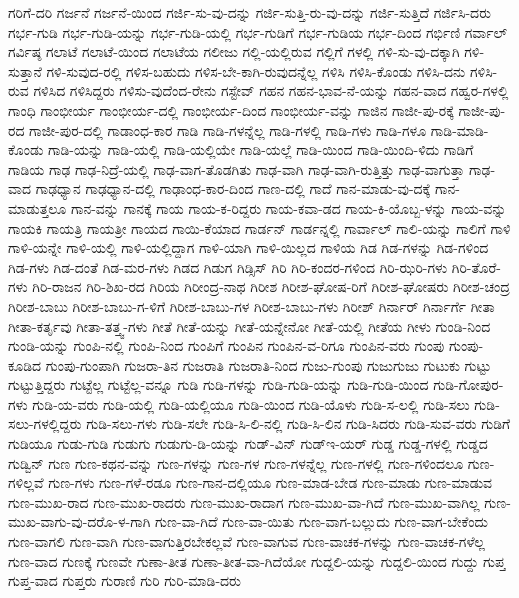 {ಗರಿಗೆ-ದರಿ
ಗರ್ಜನೆ
ಗರ್ಜನೆ-ಯಿಂದ
ಗರ್ಜಿ-ಸು-ವು-ದನ್ನು
ಗರ್ಜಿ-ಸುತ್ತಿ-ರು-ವು-ದನ್ನು
ಗರ್ಜಿ-ಸುತ್ತಿದೆ
ಗರ್ಜಿಸಿ-ದರು
ಗರ್ಭ-ಗುಡಿ
ಗರ್ಭ-ಗುಡಿ-ಯನ್ನು
ಗರ್ಭ-ಗುಡಿ-ಯಲ್ಲಿ
ಗರ್ಭ-ಗುಡಿಗೆ
ಗರ್ಭ-ಗುಡಿಯ
ಗರ್ಭ-ದಿಂದ
ಗರ್ಭಿಣಿ
ಗರ್ವಾಲ್
ಗರ್ವಿಷ್ಠ
ಗಲಾಟೆ
ಗಲಾಟೆ-ಯಿಂದ
ಗಲಾಟೆಯ
ಗಲೀಜು
ಗಲ್ಲಿ-ಯಲ್ಲಿರುವ
ಗಲ್ಲಿಗೆ
ಗಳಲ್ಲಿ
ಗಳಿ-ಸು-ವು-ದಕ್ಕಾಗಿ
ಗಳಿ-ಸುತ್ತಾನೆ
ಗಳಿ-ಸುವುದ-ರಲ್ಲಿ
ಗಳಿಸ-ಬಹುದು
ಗಳಿಸ-ಬೇ-ಕಾಗಿ-ರುವುದನ್ನೆಲ್ಲ
ಗಳಿಸಿ
ಗಳಿಸಿ-ಕೊಂಡು
ಗಳಿಸಿ-ದನು
ಗಳಿಸಿ-ರುವ
ಗಳಿಸಿದ
ಗಳಿಸಿದ್ದರು
ಗಳಿಸು-ವುದೆಂದ-ರೇನು
ಗಸ್ಟೇವ್
ಗಹನ
ಗಹನ-ಭಾವ-ನೆ-ಯನ್ನು
ಗಹನ-ವಾದ
ಗಹ್ವರ-ಗಳಲ್ಲಿ
ಗಾಂಧಿ
ಗಾಂಭೀರ್ಯ
ಗಾಂಭೀರ್ಯ-ದಲ್ಲಿ
ಗಾಂಭೀರ್ಯ-ದಿಂದ
ಗಾಂಭೀರ್ಯ-ವನ್ನು
ಗಾಜಿನ
ಗಾಜೀ-ಪು-ರಕ್ಕೆ
ಗಾಜೀ-ಪು-ರದ
ಗಾಜೀ-ಪುರ-ದಲ್ಲಿ
ಗಾಡಾಂಧ-ಕಾರ
ಗಾಡಿ
ಗಾಡಿ-ಗಳನ್ನೆಲ್ಲ
ಗಾಡಿ-ಗಳಲ್ಲಿ
ಗಾಡಿ-ಗಳು
ಗಾಡಿ-ಗಳೂ
ಗಾಡಿ-ಮಾಡಿ-ಕೊಂಡು
ಗಾಡಿ-ಯನ್ನು
ಗಾಡಿ-ಯಲ್ಲಿ
ಗಾಡಿ-ಯಲ್ಲಿಯೇ
ಗಾಡಿ-ಯಲ್ಲೆ
ಗಾಡಿ-ಯಿಂದ
ಗಾಡಿ-ಯಿಂದಿ-ಳಿದು
ಗಾಡಿಗೆ
ಗಾಡಿಯ
ಗಾಢ
ಗಾಢ-ನಿದ್ರೆ-ಯಲ್ಲಿ
ಗಾಢ-ವಾಗ-ತೊಡಗಿತು
ಗಾಢ-ವಾಗಿ
ಗಾಢ-ವಾಗಿ-ರುತ್ತಿತ್ತು
ಗಾಢ-ವಾಗುತ್ತಾ
ಗಾಢ-ವಾದ
ಗಾಢಧ್ಯಾನ
ಗಾಢಧ್ಯಾನ-ದಲ್ಲಿ
ಗಾಢಾಂಧ-ಕಾರ-ದಿಂದ
ಗಾಣ-ದಲ್ಲಿ
ಗಾದೆ
ಗಾನ-ಮಾಡು-ವು-ದಕ್ಕೆ
ಗಾನ-ಮಾಡುತ್ತಲೂ
ಗಾನ-ವನ್ನು
ಗಾನಕ್ಕೆ
ಗಾಯ
ಗಾಯ-ಕ-ರಿದ್ದರು
ಗಾಯ-ಕವಾ-ಡದ
ಗಾಯ-ಕಿ-ಯೊಬ್ಬ-ಳನ್ನು
ಗಾಯ-ವನ್ನು
ಗಾಯಕಿ
ಗಾಯತ್ರಿ
ಗಾಯತ್ರೀ
ಗಾಯದ
ಗಾಯಿ-ಕೆಯಾದ
ಗಾರ್ಡನ್
ಗಾರ್ಡನ್ನಲ್ಲಿ
ಗಾರ್ವಾಲ್
ಗಾಲಿ-ಯನ್ನು
ಗಾಲಿಗೆ
ಗಾಳಿ
ಗಾಳಿ-ಯನ್ನೇ
ಗಾಳಿ-ಯಲ್ಲಿ
ಗಾಳಿ-ಯಲ್ಲಿದ್ದಾಗ
ಗಾಳಿ-ಯಾಗಿ
ಗಾಳಿ-ಯಿಲ್ಲದ
ಗಾಳಿಯ
ಗಿಡ
ಗಿಡ-ಗಳನ್ನು
ಗಿಡ-ಗಳಿಂದ
ಗಿಡ-ಗಳು
ಗಿಡ-ದಂತೆ
ಗಿಡ-ಮರ-ಗಳು
ಗಿಡದ
ಗಿಡುಗ
ಗಿಡ್ಸಿಸ್
ಗಿರಿ
ಗಿರಿ-ಕಂದರ-ಗಳಿಂದ
ಗಿರಿ-ಝರಿ-ಗಳು
ಗಿರಿ-ತೊರೆ-ಗಳು
ಗಿರಿ-ರಾಜನ
ಗಿರಿ-ಶಿಖ-ರದ
ಗಿರಿಯ
ಗಿರೀಂದ್ರ-ನಾಥ
ಗಿರೀಶ
ಗಿರೀಶ-ಘೋಷ-ರಿಗೆ
ಗಿರೀಶ-ಘೋಷರು
ಗಿರೀಶ-ಚಂದ್ರ
ಗಿರೀಶ-ಬಾಬು
ಗಿರೀಶ-ಬಾಬು-ಗ-ಳಿಗೆ
ಗಿರೀಶ-ಬಾಬು-ಗಳ
ಗಿರೀಶ-ಬಾಬು-ಗಳು
ಗಿರೀಶ್
ಗಿರ್ನಾರ್
ಗಿರ್ನಾರ್ಗೆ
ಗೀತಾ
ಗೀತಾ-ಕರ್ತೃವು
ಗೀತಾ-ತತ್ತ್ವ-ಗಳು
ಗೀತೆ
ಗೀತೆ-ಯನ್ನು
ಗೀತೆ-ಯನ್ನೇನೋ
ಗೀತೆ-ಯಲ್ಲಿ
ಗೀತೆಯ
ಗೀಳು
ಗುಂಡಿ-ನಿಂದ
ಗುಂಡಿ-ಯನ್ನು
ಗುಂಪಿ-ನಲ್ಲಿ
ಗುಂಪಿ-ನಿಂದ
ಗುಂಪಿಗೆ
ಗುಂಪಿನ
ಗುಂಪಿನ-ವ-ರಿಗೂ
ಗುಂಪಿನ-ವರು
ಗುಂಪು
ಗುಂಪು-ಕೂಡಿದ
ಗುಂಪು-ಗುಂಪಾಗಿ
ಗುಜರಾ-ತಿನ
ಗುಜರಾತಿ
ಗುಜರಾತಿ-ನಿಂದ
ಗುಜು-ಗುಂಪು
ಗುಜುಗುಜು
ಗುಟುಕು
ಗುಟ್ಟು
ಗುಟ್ಟುತ್ತಿದ್ದರು
ಗುಟ್ಟೆಲ್ಲ
ಗುಟ್ಟೆಲ್ಲ-ವನ್ನೂ
ಗುಡಿ
ಗುಡಿ-ಗಳನ್ನು
ಗುಡಿ-ಗುಡಿ-ಯನ್ನು
ಗುಡಿ-ಗುಡಿ-ಯಿಂದ
ಗುಡಿ-ಗೋಪುರ-ಗಳು
ಗುಡಿ-ಯ-ವರು
ಗುಡಿ-ಯಲ್ಲಿ
ಗುಡಿ-ಯಲ್ಲಿಯೂ
ಗುಡಿ-ಯಿಂದ
ಗುಡಿ-ಯೊಳು
ಗುಡಿ-ಸ-ಲಲ್ಲಿ
ಗುಡಿ-ಸಲು
ಗುಡಿ-ಸಲು-ಗಳಲ್ಲಿದ್ದರು
ಗುಡಿ-ಸಲು-ಗಳು
ಗುಡಿ-ಸಲೇ
ಗುಡಿ-ಸಿ-ಲಿ-ನಲ್ಲಿ
ಗುಡಿ-ಸಿ-ಲಿನ
ಗುಡಿ-ಸಿದರು
ಗುಡಿ-ಸುವ-ವರು
ಗುಡಿಗೆ
ಗುಡಿಯೂ
ಗುಡು-ಗುಡಿ
ಗುಡುಗು
ಗುಡುಗು-ಡಿ-ಯನ್ನು
ಗುಡ್-ವಿನ್
ಗುಡ್ಇ-ಯರ್
ಗುಡ್ಡ
ಗುಡ್ಡ-ಗಳಲ್ಲಿ
ಗುಡ್ಡದ
ಗುಡ್ವಿನ್
ಗುಣ
ಗುಣ-ಕಥನ-ವನ್ನು
ಗುಣ-ಗಳನ್ನು
ಗುಣ-ಗಳ
ಗುಣ-ಗಳನ್ನೆಲ್ಲ
ಗುಣ-ಗಳಲ್ಲಿ
ಗುಣ-ಗಳಿಂದಲೂ
ಗುಣ-ಗಳಿಲ್ಲವೆ
ಗುಣ-ಗಳು
ಗುಣ-ಗಳೆ-ರಡೂ
ಗುಣ-ಗಾನ-ದಲ್ಲಿಯೂ
ಗುಣ-ಮಾಡ-ಬೇಡ
ಗುಣ-ಮಾಡು
ಗುಣ-ಮಾಡುವ
ಗುಣ-ಮುಖ-ರಾದ
ಗುಣ-ಮುಖ-ರಾದರು
ಗುಣ-ಮುಖ-ರಾದಾಗ
ಗುಣ-ಮುಖ-ವಾ-ಗಿದೆ
ಗುಣ-ಮುಖ-ವಾಗಿಲ್ಲ
ಗುಣ-ಮುಖ-ವಾಗು-ವು-ದರೊ-ಳ-ಗಾಗಿ
ಗುಣ-ವಾ-ಗಿದೆ
ಗುಣ-ವಾ-ಯಿತು
ಗುಣ-ವಾಗ-ಬಲ್ಲುದು
ಗುಣ-ವಾಗ-ಬೇಕೆಂದು
ಗುಣ-ವಾಗಲಿ
ಗುಣ-ವಾಗಿ
ಗುಣ-ವಾಗುತ್ತಿರಬೇಕಲ್ಲವೆ
ಗುಣ-ವಾಗುವ
ಗುಣ-ವಾಚಕ-ಗಳನ್ನು
ಗುಣ-ವಾಚಕ-ಗಳೆಲ್ಲ
ಗುಣ-ವಾದ
ಗುಣಕ್ಕೆ
ಗುಣವೇ
ಗುಣಾ-ತೀತ
ಗುಣಾ-ತೀತ-ವಾ-ಗಿದೆಯೋ
ಗುದ್ದಲಿ-ಯನ್ನು
ಗುದ್ದಲಿ-ಯಿಂದ
ಗುದ್ದು
ಗುಪ್ತ
ಗುಪ್ತ-ವಾದ
ಗುಪ್ತರು
ಗುರಾಣಿ
ಗುರಿ
ಗುರಿ-ಮಾಡಿ-ದರು
}
